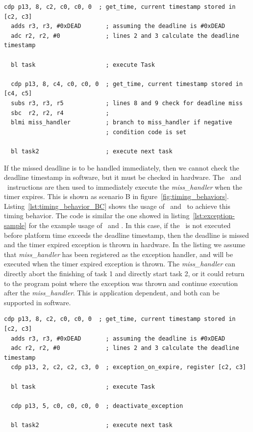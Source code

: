 \begin{lstlisting}[float=h, label=lst:timing_behavior_A,caption=Assembly code to implement scenario A]
  cdp p13, 8, c2, c0, c0, 0  ; get_time, current timestamp stored in [c2, c3]
  adds r3, r3, #0xDEAD       ; assuming the deadline is #0xDEAD
  adc r2, r2, #0             ; lines 2 and 3 calculate the deadline timestamp
   
  bl task                    ; execute Task
  
  cdp p13, 8, c4, c0, c0, 0  ; get_time, current timestamp stored in [c4, c5]
  subs r3, r3, r5            ; lines 8 and 9 check for deadline miss
  sbc  r2, r2, r4            ; 
  blmi miss_handler          ; branch to miss_handler if negative 
                             ; condition code is set
     
  bl task2                   ; execute next task
\end{lstlisting}

If the missed deadline is to be handled immediately, then we cannot check the deadline timestamp in software, but it must be checked in hardware.  
The \exceptiononexpire\ and \deactivateexception\ instructions are then used to immediately execute the \emph{miss\_handler} when the timer expires.
This is shown as scenario B in figure~\ref{fig:timing_behaviors}.
Listing~\ref{lst:timing_behavior_BC} shows the usage of \exceptiononexpire\ and \deactivateexception\ to achieve this timing behavior.
The code is similar the one showed in listing~\ref{lst:exception-sample} for the example usage of \exceptiononexpire\ and \deactivateexception.
In this case, if the \deactivateexception\ is not executed before platform time exceeds the deadline timestamp, then the deadline is missed and the timer expired exception is thrown in hardware.
In the listing we assume that \emph{miss\_handler} has been registered as the exception handler, and will be executed when the timer expired exception is thrown.
The \emph{miss\_handler} can directly abort the finishing of task 1 and directly start task 2, or it could return to the program point where the exception was thrown and continue execution after the \emph{miss\_handler}. 
This is application dependent, and both can be supported in software.   

\begin{lstlisting}[float=h, label=lst:timing_behavior_BC,caption=Assembly code to implement scenario B and C]
  cdp p13, 8, c2, c0, c0, 0  ; get_time, current timestamp stored in [c2, c3]
  adds r3, r3, #0xDEAD       ; assuming the deadline is #0xDEAD
  adc r2, r2, #0             ; lines 2 and 3 calculate the deadline timestamp
  cdp p13, 2, c2, c2, c3, 0  ; exception_on_expire, register [c2, c3]
   
  bl task                    ; execute Task
  
  cdp p13, 5, c0, c0, c0, 0  ; deactivate_exception
     
  bl task2                   ; execute next task
\end{lstlisting}

